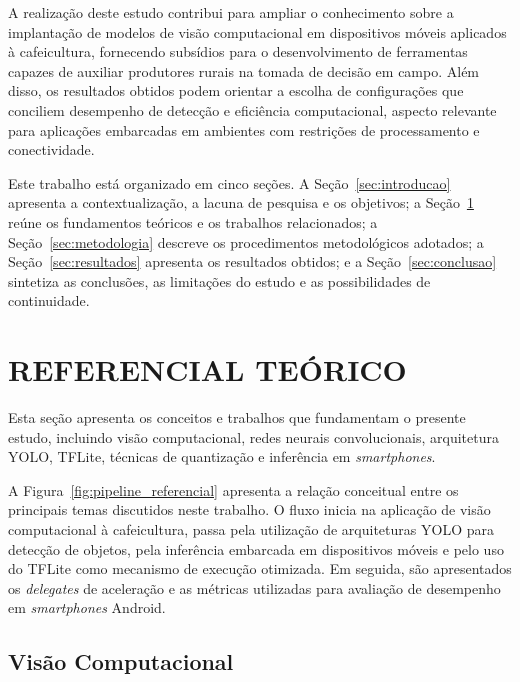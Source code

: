 \documentclass[artigo,times,capa]{iftex2024}
\begin{document}
A realização deste estudo contribui para ampliar o conhecimento sobre a implantação de modelos de visão computacional em dispositivos móveis aplicados à cafeicultura, fornecendo subsídios para o desenvolvimento de ferramentas capazes de auxiliar produtores rurais na tomada de decisão em campo. Além disso, os resultados obtidos podem orientar a escolha de configurações que conciliem desempenho de detecção e eficiência computacional, aspecto relevante para aplicações embarcadas em ambientes com restrições de processamento e conectividade.

Este trabalho está organizado em cinco seções. A Seção~\ref{sec:introducao} apresenta a contextualização, a lacuna de pesquisa e os objetivos; a Seção~\ref{sec:referencial_teorico} reúne os fundamentos teóricos e os trabalhos relacionados; a Seção~\ref{sec:metodologia} descreve os procedimentos metodológicos adotados; a Seção~\ref{sec:resultados} apresenta os resultados obtidos; e a Seção~\ref{sec:conclusao} sintetiza as conclusões, as limitações do estudo e as possibilidades de continuidade.

\section{REFERENCIAL TEÓRICO}
\label{sec:referencial_teorico}
 
Esta seção apresenta os conceitos e trabalhos que fundamentam o presente estudo, incluindo visão computacional, redes neurais convolucionais, arquitetura \ac{YOLO}, \ac{TFLite}, técnicas de quantização e inferência em \textit{smartphones}.



A Figura~\ref{fig:pipeline_referencial} apresenta a relação conceitual entre os principais temas discutidos neste trabalho. O fluxo inicia na aplicação de visão computacional à cafeicultura, passa pela utilização de arquiteturas \ac{YOLO} para detecção de objetos, pela inferência embarcada em dispositivos móveis e pelo uso do \ac{TFLite} como mecanismo de execução otimizada. Em seguida, são apresentados os \textit{delegates} de aceleração e as métricas utilizadas para avaliação de desempenho em \textit{smartphones} Android.

\FloatBarrier

\subsection{Visão Computacional}
 
\end{document}
